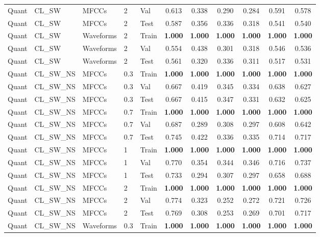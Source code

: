 \begin{landscape}
\begin{longtable}{|l|l|l|l|l|c|c|c|c|c|c|}
Quant & CL\_SW & MFCCs & 2 & Val & 0.613 & 0.338 & 0.290 & 0.284 & 0.591 & 0.578 \\
Quant & CL\_SW & MFCCs & 2 & Test & 0.587 & 0.356 & 0.336 & 0.318 & 0.541 & 0.540 \\
Quant & CL\_SW & Waveforms & 2 & Train & \textbf{1.000} & \textbf{1.000} & \textbf{1.000} & \textbf{1.000} & \textbf{1.000} & \textbf{1.000} \\
Quant & CL\_SW & Waveforms & 2 & Val & 0.554 & 0.438 & 0.301 & 0.318 & 0.546 & 0.536 \\
Quant & CL\_SW & Waveforms & 2 & Test & 0.561 & 0.320 & 0.336 & 0.311 & 0.517 & 0.531 \\
Quant & CL\_SW\_NS & MFCCs & 0.3 & Train & \textbf{1.000} & \textbf{1.000} & \textbf{1.000} & \textbf{1.000} & \textbf{1.000} & \textbf{1.000} \\
Quant & CL\_SW\_NS & MFCCs & 0.3 & Val & 0.667 & 0.419 & 0.345 & 0.334 & 0.638 & 0.627 \\
Quant & CL\_SW\_NS & MFCCs & 0.3 & Test & 0.667 & 0.415 & 0.347 & 0.331 & 0.632 & 0.625 \\
Quant & CL\_SW\_NS & MFCCs & 0.7 & Train & \textbf{1.000} & \textbf{1.000} & \textbf{1.000} & \textbf{1.000} & \textbf{1.000} & \textbf{1.000} \\
Quant & CL\_SW\_NS & MFCCs & 0.7 & Val & 0.687 & 0.289 & 0.308 & 0.297 & 0.608 & 0.642 \\
Quant & CL\_SW\_NS & MFCCs & 0.7 & Test & 0.745 & 0.422 & 0.336 & 0.335 & 0.714 & 0.717 \\
Quant & CL\_SW\_NS & MFCCs & 1 & Train & \textbf{1.000} & \textbf{1.000} & \textbf{1.000} & \textbf{1.000} & \textbf{1.000} & \textbf{1.000} \\
Quant & CL\_SW\_NS & MFCCs & 1 & Val & 0.770 & 0.354 & 0.344 & 0.346 & 0.716 & 0.737 \\
Quant & CL\_SW\_NS & MFCCs & 1 & Test & 0.733 & 0.294 & 0.307 & 0.297 & 0.658 & 0.688 \\
Quant & CL\_SW\_NS & MFCCs & 2 & Train & \textbf{1.000} & \textbf{1.000} & \textbf{1.000} & \textbf{1.000} & \textbf{1.000} & \textbf{1.000} \\
Quant & CL\_SW\_NS & MFCCs & 2 & Val & 0.774 & 0.323 & 0.252 & 0.272 & 0.721 & 0.726 \\
Quant & CL\_SW\_NS & MFCCs & 2 & Test & 0.769 & 0.308 & 0.253 & 0.269 & 0.701 & 0.717 \\
Quant & CL\_SW\_NS & Waveforms & 0.3 & Train & \textbf{1.000} & \textbf{1.000} & \textbf{1.000} & \textbf{1.000} & \textbf{1.000} & \textbf{1.000} \\

\end{longtable}
\end{landscape}
